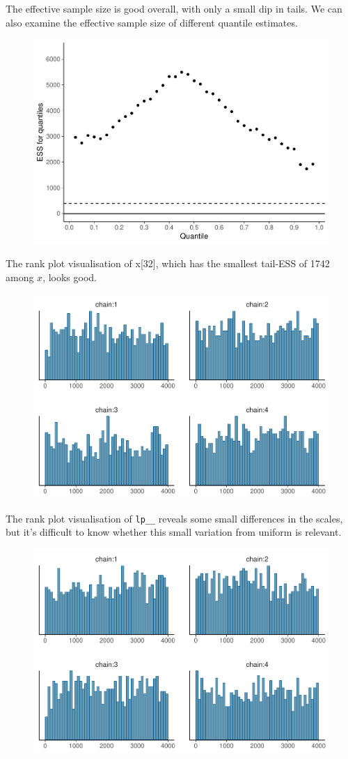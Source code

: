 \documentclass[american,]{article}
\begin{document}
The effective sample size is good overall, with only a small dip in
tails. We can also examine the effective sample size of different
quantile estimates.

\begin{figure}[tp]
  \centering
  \includegraphics[width=0.6\linewidth]{graphics/quantile-ess-fit-half-nom-1.pdf}
\end{figure}

The rank plot visualisation of x{[}32{]}, which has the smallest
tail-ESS of 1742 among \(x\), looks good.

\begin{figure}[tp]
  \centering
  \includegraphics[width=0.6\linewidth]{graphics/hist-fit-half-nom-1.pdf}
\end{figure}

The rank plot visualisation of \texttt{lp\_\_} reveals some small
differences in the scales, but it's difficult to know whether this small
variation from uniform is relevant.

\begin{figure}[tp]
  \centering
  \includegraphics[width=0.6\linewidth]{graphics/hist-fit-half-nom-lp-1.pdf}
\end{figure}
\end{document}
